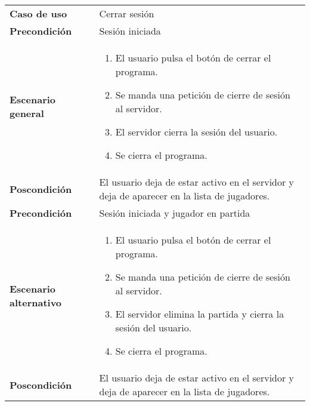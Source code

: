 {\footnotesize
\begin{tabularx}{0.95\textwidth}{p{}|X}

\textbf{Caso de uso} & Cerrar sesión \\

\textbf{Precondición} & Sesión iniciada \\

\textbf{Escenario general} & \begin{enumerate}
\item El usuario pulsa el botón de cerrar el programa.
\item Se manda una petición de cierre de sesión al servidor.
\item El servidor cierra la sesión del usuario.
\item Se cierra el programa.
\end{enumerate} \\

\textbf{Poscondición} & El usuario deja de estar activo en el servidor y deja de aparecer
en la lista de jugadores.\\

\textbf{Precondición} & Sesión iniciada y jugador en partida \\

\textbf{Escenario alternativo} & \begin{enumerate}
\item El usuario pulsa el botón de cerrar el programa.
\item Se manda una petición de cierre de sesión al servidor.
\item El servidor elimina la partida y cierra la sesión del usuario.
\item Se cierra el programa.
\end{enumerate} \\

\textbf{Poscondición} & El usuario deja de estar activo en el servidor y deja de aparecer
en la lista de jugadores.

\end{tabularx}
}

